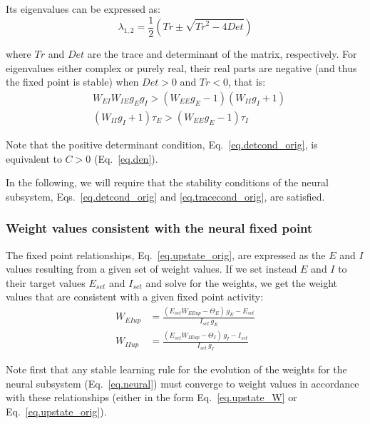 \documentclass[twocolumn]{article}
\newcommand{\EE}{\mathit{EE}}
\newcommand{\EI}{\mathit{EI}}
\newcommand{\IE}{\mathit{IE}}
\newcommand{\II}{\mathit{II}}
\newcommand{\set}{\mathit{set}}
\newcommand{\up}{\mathit{up}}
\newcommand{\De}{\mathit{Det}}
\newcommand{\Tr}{\mathit{Tr}}
\begin{document}
\noindent Its eigenvalues can be expressed as:
\begin{equation}
\lambda_{1,2} = \frac{1}{2}\left(\Tr \pm \sqrt{\Tr^2 - 4\De} \right)
\label{eq.neural.eigvals}
\end{equation}

\noindent where $\Tr$ and $\De$ are the trace and determinant of the matrix, respectively. For eigenvalues either complex or purely real, their real parts are negative (and thus the fixed point is stable) when $\De>0$ and $\Tr<0$, that is:
\begin{eqnarray}
& W_{\EI} W_{\IE} g_E g_I > (W_{\EE} g_E - 1)(W_{\II} g_I + 1) \label{eq.detcond_orig}\\
& (W_{\II} g_I + 1)\tau_E > (W_{\EE} g_E - 1)\tau_I
\label{eq.tracecond_orig}
\end{eqnarray}

\noindent Note that the positive determinant condition, Eq.\ \ref{eq.detcond_orig}, is equivalent to $C>0$ (Eq.\ \ref{eq.den}).

In the following, we will require that the stability conditions of the neural subsystem, Eqs.\ \ref{eq.detcond_orig} and \ref{eq.tracecond_orig}, are satisfied.



\subsubsection{Weight values consistent with the neural fixed point}

The fixed point relationships, Eq.\ \ref{eq.upstate_orig}, are expressed as the $E$ and $I$ values resulting from a given set of weight values. If we set instead $E$ and $I$ to their target values $E_{\set}$ and $I_{\set}$ and solve for the weights, we get the weight values that are consistent with a given fixed point activity:
\begin{equation}
\begin{aligned}
W_{\EI\up} & = \frac{(E_{\set} W_{\EE\up} - \Theta_E) \, g_E - E_{\set}}{I_{\set} \, g_E} \\
W_{\II\up} & = \frac{(E_{\set} W_{\IE\up} - \Theta_I) \, g_I - I_{\set}}{I_{\set} \, g_I}
\end{aligned}
\label{eq.upstate_W}
\end{equation}

\noindent Note first that any stable learning rule for the evolution of the weights for the neural subsystem (Eq.\ \ref{eq.neural}) must converge to weight values in accordance with these relationships (either in the form Eq.\ \ref{eq.upstate_W} or Eq.\ \ref{eq.upstate_orig}).
\end{document}
